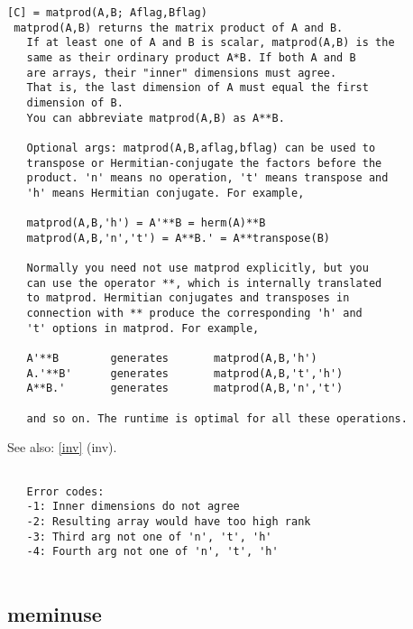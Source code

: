 \documentclass[a4paper]{article}
\begin{document}
\begin{tscreen}
\begin{verbatim}
[C] = matprod(A,B; Aflag,Bflag)
 matprod(A,B) returns the matrix product of A and B.
   If at least one of A and B is scalar, matprod(A,B) is the
   same as their ordinary product A*B. If both A and B
   are arrays, their "inner" dimensions must agree.
   That is, the last dimension of A must equal the first
   dimension of B.
   You can abbreviate matprod(A,B) as A**B.

   Optional args: matprod(A,B,aflag,bflag) can be used to
   transpose or Hermitian-conjugate the factors before the
   product. 'n' means no operation, 't' means transpose and
   'h' means Hermitian conjugate. For example,

   matprod(A,B,'h') = A'**B = herm(A)**B
   matprod(A,B,'n','t') = A**B.' = A**transpose(B)

   Normally you need not use matprod explicitly, but you
   can use the operator **, which is internally translated
   to matprod. Hermitian conjugates and transposes in
   connection with ** produce the corresponding 'h' and
   't' options in matprod. For example,

   A'**B        generates       matprod(A,B,'h')
   A.'**B'      generates       matprod(A,B,'t','h')
   A**B.'       generates       matprod(A,B,'n','t')

   and so on. The runtime is optimal for all these operations.
\end{verbatim}

See also: \ref{inv} {(inv)}.
\begin{verbatim}
   
   Error codes:
   -1: Inner dimensions do not agree
   -2: Resulting array would have too high rank
   -3: Third arg not one of 'n', 't', 'h'
   -4: Fourth arg not one of 'n', 't', 'h'
   
\end{verbatim}
\end{tscreen}





\subsection{meminuse\label{meminuse}}
\end{document}
